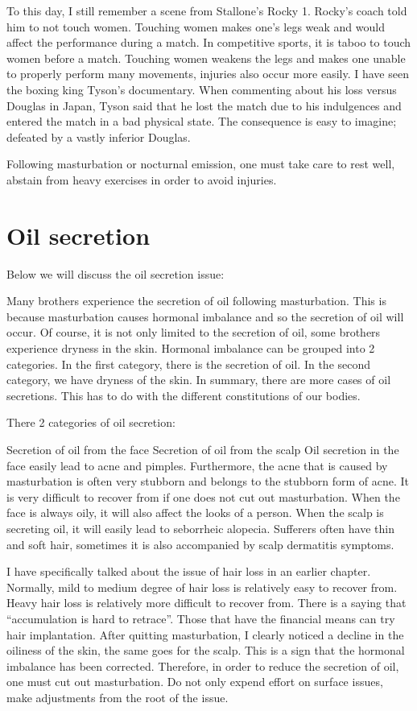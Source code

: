 \documentclass[
]{book}
\begin{document}
To this day, I still remember a scene from Stallone's Rocky 1. Rocky's coach told him to not touch women. Touching women makes one's legs weak and would affect the performance during a match. In competitive sports, it is taboo to touch women before a match. Touching women weakens the legs and makes one unable to properly perform many movements, injuries also occur more easily. I have seen the boxing king Tyson's documentary. When commenting about his loss versus Douglas in Japan, Tyson said that he lost the match due to his indulgences and entered the match in a bad physical state. The consequence is easy to imagine; defeated by a vastly inferior Douglas.

Following masturbation or nocturnal emission, one must take care to rest well, abstain from heavy exercises in order to avoid injuries.

\hypertarget{oil-secretion}{%
\section{Oil secretion}\label{oil-secretion}}

Below we will discuss the oil secretion issue:

Many brothers experience the secretion of oil following masturbation. This is because masturbation causes hormonal imbalance and so the secretion of oil will occur. Of course, it is not only limited to the secretion of oil, some brothers experience dryness in the skin. Hormonal imbalance can be grouped into 2 categories. In the first category, there is the secretion of oil. In the second category, we have dryness of the skin. In summary, there are more cases of oil secretions. This has to do with the different constitutions of our bodies.

There 2 categories of oil secretion:

Secretion of oil from the face
Secretion of oil from the scalp
Oil secretion in the face easily lead to acne and pimples. Furthermore, the acne that is caused by masturbation is often very stubborn and belongs to the stubborn form of acne. It is very difficult to recover from if one does not cut out masturbation. When the face is always oily, it will also affect the looks of a person. When the scalp is secreting oil, it will easily lead to seborrheic alopecia. Sufferers often have thin and soft hair, sometimes it is also accompanied by scalp dermatitis symptoms.

I have specifically talked about the issue of hair loss in an earlier chapter. Normally, mild to medium degree of hair loss is relatively easy to recover from. Heavy hair loss is relatively more difficult to recover from. There is a saying that ``accumulation is hard to retrace''. Those that have the financial means can try hair implantation. After quitting masturbation, I clearly noticed a decline in the oiliness of the skin, the same goes for the scalp. This is a sign that the hormonal imbalance has been corrected. Therefore, in order to reduce the secretion of oil, one must cut out masturbation. Do not only expend effort on surface issues, make adjustments from the root of the issue.
\end{document}
